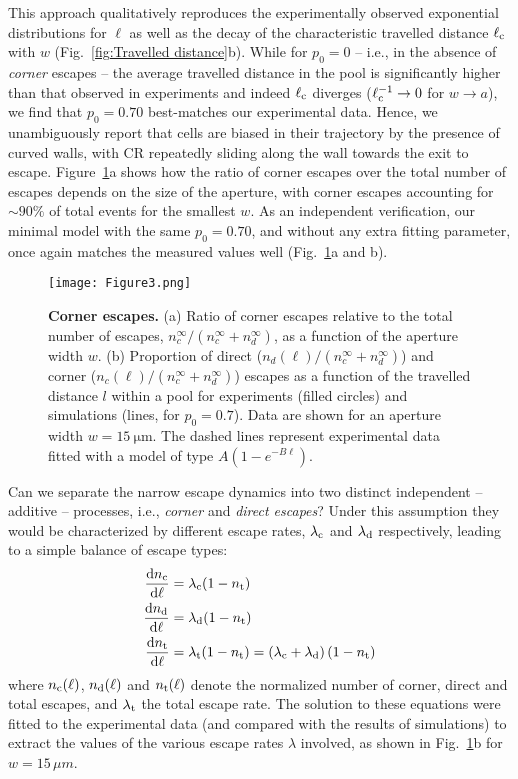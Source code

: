 \documentclass[aps,showpacs,superscriptaddress,amsfonts,twocolumn,prl]{revtex4}
\begin{document}
This approach qualitatively reproduces the experimentally observed exponential distributions for $\ell$ as well as the decay of the characteristic travelled distance $\ell_{\rm c}$ with $w$ (Fig.~\ref{fig:Travelled distance}b). While for $p_0 = 0$ -- i.e., in the absence of \textit{corner} escapes -- the average travelled distance in the pool is significantly higher than that observed in experiments and indeed $\ell_{\rm c}$ diverges ($\ell_{\rm c}^{-1}\rightarrow 0$ for $w\rightarrow a$), we find that $p_0 = 0.70$ best-matches our experimental data. Hence, we unambiguously report that cells are biased in their trajectory by the presence of curved walls, with CR repeatedly sliding along the wall towards the exit to escape. Figure~\ref{fig:Corner escapes}a shows how the ratio of corner escapes over the total number of escapes depends on the size of the aperture, with corner escapes accounting for $\sim 90\%$ of total events for the smallest $w$. As an independent verification, our minimal model with the same $p_0 = 0.70$, and without any extra fitting parameter, once again matches the measured values well (Fig.~\ref{fig:Corner escapes}a and b).

\begin{figure}[tb]
	\texttt{[image: Figure3.png]}
	\caption{\label{fig:Corner escapes} \textbf{Corner escapes.} (a) Ratio of corner escapes relative to the total number of escapes, $n_c^\infty/(n_c^\infty+n_d^\infty)$, as a function of the aperture width $w$. (b) Proportion of direct ($n_d(\ell)/(n_c^\infty+n_d^\infty)$) and corner ($n_c(\ell)/(n_c^\infty+n_d^\infty)$) escapes as a function of the travelled distance $l$ within a pool for experiments (filled circles) and simulations (lines, for $p_0=0.7$). Data are shown for an aperture width $w=\SI{15}{\micro\meter}$. The dashed lines represent experimental data fitted with a model of type $A\left(1-e^{-B\ell}\right)$.}
\end{figure}

Can we separate the narrow escape dynamics into two distinct independent -- additive -- processes, i.e., \textit{corner} and \textit{direct escapes}? Under this assumption they would be characterized by different escape rates, $\lambda_{\rm c}$ and $\lambda_{\rm d}$ respectively, leading to a simple balance of escape types:
\begin{equation}
	\begin{split}
		\dv{n_{\rm c}}{\ell} &= \lambda_{\rm c}(1-n_{\rm t})\\
		\dv{n_{\rm d}}{\ell} &= \lambda_{\rm d}(1-n_{\rm t})\\
		\dv{n_{\rm t}}{\ell} &= \lambda_{\rm t}(1-n_{\rm t}) = \left(\lambda_{\rm c}+\lambda_{\rm d}\right)(1-n_{\rm t})
	\end{split}
\end{equation}
where $n_{\rm c}(\ell)$, $n_{\rm d}(\ell)$ and $n_{\rm t}(\ell)$ denote the normalized number of corner, direct and total escapes, and $\lambda_{\rm t}$ the total escape rate. The solution to these equations were fitted to the experimental data (and compared with the results of simulations) to extract the values of the various escape rates $\lambda$ involved, as shown in Fig.~\ref{fig:Corner escapes}b for $w=15\,\mu m$.
\end{document}
